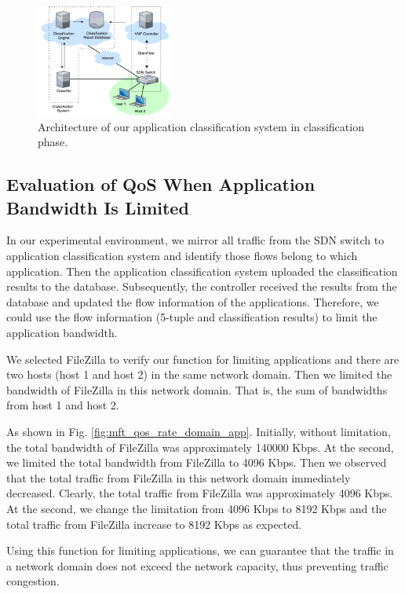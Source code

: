 \documentclass[conference]{IEEEtran}
\begin{document}
\begin{figure}[!t]
\centering
\includegraphics[width=0.4\textwidth]{./figures/classification_classifying}
\caption{Architecture of our application classification system in classification phase.}
\label{fig:class_classifying}
\end{figure}



\subsection{Evaluation of QoS When Application Bandwidth Is Limited}
In our experimental environment, we mirror all traffic from the SDN switch to application classification system and identify those flows belong to which application.
Then the application classification system uploaded the classification results to the database.
Subsequently, the controller received the results from the database and updated the flow information of the applications.
Therefore, we could use the flow information (5-tuple and classification results) to limit the application bandwidth.

We selected FileZilla to verify our function for limiting applications and there are two hosts (host 1 and host 2) in the same network domain.
Then we limited the bandwidth of FileZilla in this network domain. That is, the sum of bandwidths from host 1 and host 2.

As shown in Fig. \ref{fig:mft_qos_rate_domain_app}.
Initially, without limitation, the total bandwidth of FileZilla was approximately 140000 Kbps.
At the  second, we limited the total bandwidth from FileZilla to 4096 Kbps.
Then we observed that the total traffic from FileZilla in this network domain immediately decreased.
Clearly, the total traffic from FileZilla was approximately 4096 Kbps.
At the  second, we change the limitation from 4096 Kbps to 8192 Kbps and the total traffic from FileZilla increase to 8192 Kbps as expected.

Using this function for limiting applications, we can guarantee that the traffic in a network domain does not exceed the network capacity, thus preventing traffic congestion.
\end{document}
